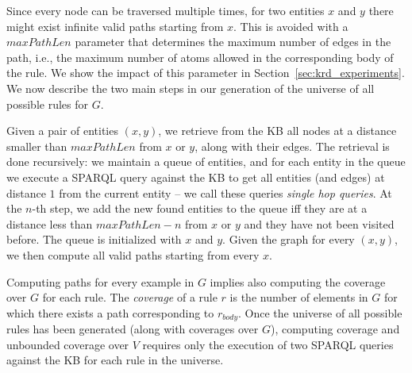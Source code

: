 Since every node can be traversed multiple times, for two entities $x$ and $y$ there might exist infinite valid paths starting from $x$. This is avoided with a $maxPathLen$ parameter that 
determines the maximum number of edges in the path, %
i.e., the maximum number of atoms allowed in the corresponding body of the rule.
We show the impact of this parameter in Section~\ref{sec:krd_experiments}. 
We now describe the two main steps in our generation of the universe of all possible rules for $G$. 

\noindent {}
Given a pair of entities $(x,y)$, we retrieve from the KB all nodes at a distance smaller than $maxPathLen$ from $x$ or $y$, along with their edges. The retrieval is done recursively: we maintain a queue of entities, and for each entity in the queue we execute a SPARQL query against the KB to get all entities (and edges) at distance $1$ from the current entity -- we call these queries \emph{single hop queries}. At the $n$-th step, we add the new found entities to the queue iff they are at a distance less than $maxPathLen-n$ from $x$ or $y$ and they have not been visited before. The queue is initialized with $x$ and $y$. 
%
Given the graph for every $(x,y)$, we then compute all valid paths starting from every $x$. 

\noindent {}
Computing paths for every example in $G$ implies also computing the coverage over $G$ for each rule. The {\em coverage} of a rule $r$ is the number of elements in $G$ for which there exists a path corresponding to $r_{body}$. 
%
%
Once the universe of all possible rules has been generated (along with coverages over $G$), computing coverage and unbounded coverage over $V$ requires only the execution of two SPARQL queries against the KB for each rule in the universe.

